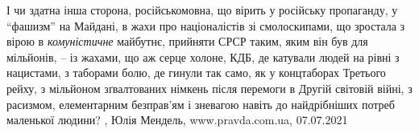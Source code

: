 І чи здатна інша сторона, російськомовна, що вірить у російську пропаганду, у
\enquote{фашизм} на Майдані, в жахи про націоналістів зі смолоскипами, що зростала з
вірою в \emph{комуністичне} майбутнє, прийняти СРСР таким, яким він був для мільйонів,
– із жахами, що аж серце холоне, КДБ, де катували людей на рівні з нацистами, з
таборами болю, де гинули так само, як у концтаборах Третього рейху, з мільйоном
зґвалтованих німкень після перемоги в Другій світовій війні, з расизмом,
елементарним безправ’ям і зневагою навіть до найдрібніших потреб маленької
людини? 
, 
Юлія Мендель, www.pravda.com.ua, 07.07.2021

